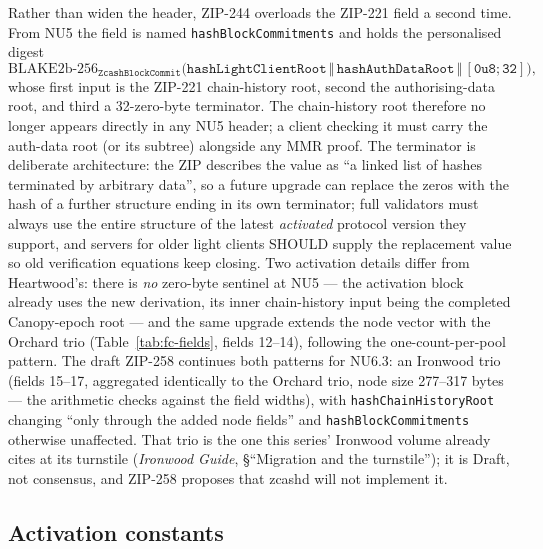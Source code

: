 \documentclass[11pt,a4paper]{article}
\theoremstyle{definition}
\begin{document}
Rather than widen the header, ZIP-244 overloads the ZIP-221 field a
second time. From NU5 the field is named \texttt{hashBlockCommitments}
and holds the personalised digest
\[
\mathrm{BLAKE2b\text{-}256}_{\mathtt{ZcashBlockCommit}}\bigl(
\texttt{hashLightClientRoot} \,\Vert\, \texttt{hashAuthDataRoot}
\,\Vert\, \mathtt{[0u8;32]}\bigr),
\]
whose first input is the ZIP-221 chain-history root, second the
authorising-data root, and third a 32-zero-byte terminator. The
chain-history root therefore no longer appears directly in any NU5
header; a client checking it must carry the auth-data root (or its
subtree) alongside any MMR proof. The terminator is deliberate
architecture: the ZIP describes the value as ``a linked list of hashes
terminated by arbitrary data'', so a future upgrade can replace the
zeros with the hash of a further structure ending in its own terminator;
full validators must always use the entire structure of the latest
\emph{activated} protocol version they support, and servers for older
light clients SHOULD supply
the replacement value so old verification equations keep closing. Two
activation details differ from Heartwood's: there is \emph{no} zero-byte
sentinel at NU5 --- the activation block already uses the new derivation,
its inner chain-history input being the completed Canopy-epoch root ---
and the same upgrade extends the node vector with the Orchard trio
(Table~\ref{tab:fc-fields}, fields 12--14), following the
one-count-per-pool pattern. The draft ZIP-258 continues both patterns
for NU6.3: an Ironwood trio (fields 15--17, aggregated identically to
the Orchard trio, node size 277--317 bytes --- the arithmetic checks
against the field widths), with \texttt{hashChainHistoryRoot} changing
``only through the added node fields'' and
\texttt{hashBlockCommitments} otherwise unaffected. That trio is the
one this series' Ironwood volume already cites at its turnstile
(\emph{Ironwood Guide}, \S``Migration and the turnstile''); it is Draft,
not consensus, and ZIP-258 proposes that \textsf{zcashd} will not
implement it.

\subsection{Activation constants}\label{sec:fc-activations}
\end{document}
